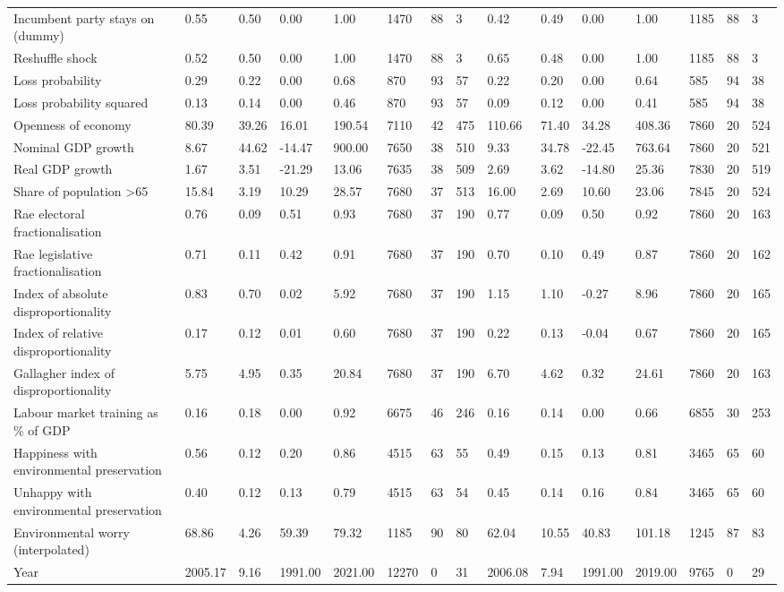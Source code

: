 \begin{longtable}{lllllllllllllll}
Incumbent party stays on (dummy) & 0.55 & 0.50 & 0.00 & 1.00 & 1470 & 88 & 3 & 0.42 & 0.49 & 0.00 & 1.00 & 1185 & 88 & 3\\
\addlinespace
Reshuffle shock & 0.52 & 0.50 & 0.00 & 1.00 & 1470 & 88 & 3 & 0.65 & 0.48 & 0.00 & 1.00 & 1185 & 88 & 3\\
Loss probability & 0.29 & 0.22 & 0.00 & 0.68 & 870 & 93 & 57 & 0.22 & 0.20 & 0.00 & 0.64 & 585 & 94 & 38\\
Loss probability squared & 0.13 & 0.14 & 0.00 & 0.46 & 870 & 93 & 57 & 0.09 & 0.12 & 0.00 & 0.41 & 585 & 94 & 38\\
Openness of economy & 80.39 & 39.26 & 16.01 & 190.54 & 7110 & 42 & 475 & 110.66 & 71.40 & 34.28 & 408.36 & 7860 & 20 & 524\\
Nominal GDP growth & 8.67 & 44.62 & -14.47 & 900.00 & 7650 & 38 & 510 & 9.33 & 34.78 & -22.45 & 763.64 & 7860 & 20 & 521\\
\addlinespace
Real GDP growth & 1.67 & 3.51 & -21.29 & 13.06 & 7635 & 38 & 509 & 2.69 & 3.62 & -14.80 & 25.36 & 7830 & 20 & 519\\
Share of population >65 & 15.84 & 3.19 & 10.29 & 28.57 & 7680 & 37 & 513 & 16.00 & 2.69 & 10.60 & 23.06 & 7845 & 20 & 524\\
Rae electoral fractionalisation & 0.76 & 0.09 & 0.51 & 0.93 & 7680 & 37 & 190 & 0.77 & 0.09 & 0.50 & 0.92 & 7860 & 20 & 163\\
Rae legislative fractionalisation & 0.71 & 0.11 & 0.42 & 0.91 & 7680 & 37 & 190 & 0.70 & 0.10 & 0.49 & 0.87 & 7860 & 20 & 162\\
Index of absolute disproportionality & 0.83 & 0.70 & 0.02 & 5.92 & 7680 & 37 & 190 & 1.15 & 1.10 & -0.27 & 8.96 & 7860 & 20 & 165\\
\addlinespace
Index of relative disproportionality & 0.17 & 0.12 & 0.01 & 0.60 & 7680 & 37 & 190 & 0.22 & 0.13 & -0.04 & 0.67 & 7860 & 20 & 165\\
Gallagher index of disproportionality & 5.75 & 4.95 & 0.35 & 20.84 & 7680 & 37 & 190 & 6.70 & 4.62 & 0.32 & 24.61 & 7860 & 20 & 163\\
Labour market training as \% of GDP & 0.16 & 0.18 & 0.00 & 0.92 & 6675 & 46 & 246 & 0.16 & 0.14 & 0.00 & 0.66 & 6855 & 30 & 253\\
Happiness with environmental preservation & 0.56 & 0.12 & 0.20 & 0.86 & 4515 & 63 & 55 & 0.49 & 0.15 & 0.13 & 0.81 & 3465 & 65 & 60\\
Unhappy with environmental preservation & 0.40 & 0.12 & 0.13 & 0.79 & 4515 & 63 & 54 & 0.45 & 0.14 & 0.16 & 0.84 & 3465 & 65 & 60\\
\addlinespace
Environmental worry (interpolated) & 68.86 & 4.26 & 59.39 & 79.32 & 1185 & 90 & 80 & 62.04 & 10.55 & 40.83 & 101.18 & 1245 & 87 & 83\\
Year & 2005.17 & 9.16 & 1991.00 & 2021.00 & 12270 & 0 & 31 & 2006.08 & 7.94 & 1991.00 & 2019.00 & 9765 & 0 & 29\\
\bottomrule
\end{longtable}
